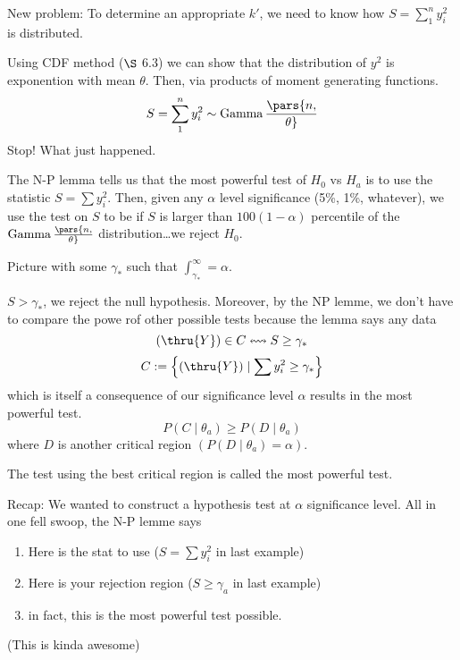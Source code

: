 \nl New problem: To determine an appropriate $k'$, we need to know how $S = \sum_1^n y_i^2$ is distributed. 

\nl Using CDF method ($\S$ 6.3) we can show that the distribution of $y^2$ is exponention with mean $\theta$. Then, via products of moment generating functions. $$S = \sum_1^n y_i^2 \sim \operatorname{Gamma}\pars{n, \over{\theta}}$$
Stop! What just happened. 

\nl The N-P lemma tells us that the most powerful test of $H_0$ vs $H_a$ is to use the statistic $S = \sum y_i^2$. Then, given any $\alpha$ level significance (5\%, 1\%, whatever), we use the test on $S$ to be if $S$ is larger than $100(1-\alpha)$ percentile of the $\operatorname{Gamma}\pars{n, \over{\theta}}$ distribution\dots we reject $H_0$. 

\nl Picture with some $\gamma_*$ such that $\int_{\gamma_*}^{\infty} = \alpha$.

\nl $S > \gamma_*$, we reject the null hypothesis. Moreover, by the NP lemme, we don't have to compare the powe rof other possible tests because the lemma says any data
$$(\thru{Y}) \in C \leftrightsquigarrow S \geq \gamma_*$$
$$C := \left\{ (\thru{Y}) \mid \sum y_i^2 \geq \gamma_* \right\}$$
which is itself a consequence of our significance level $\alpha$ results in the most powerful test. 
$$P(C \mid \theta_a) \geq P(D \mid \theta_a)$$
where $D$ is another critical region $(P(D \mid \theta_a) = \alpha )$.

 The test using the best critical region is called the most powerful test. 

\nl Recap: We wanted to construct a hypothesis test at $\alpha$ significance level. All in one fell swoop, the N-P lemme says
\begin{enumerate}
    \item Here is the stat to use ($S = \sum y_i^2$ in last example) 
    \item Here is your rejection region ($S \geq \gamma_a$ in last example)
    \item in fact, this is the most powerful test possible.
\end{enumerate}
(This is kinda awesome)

